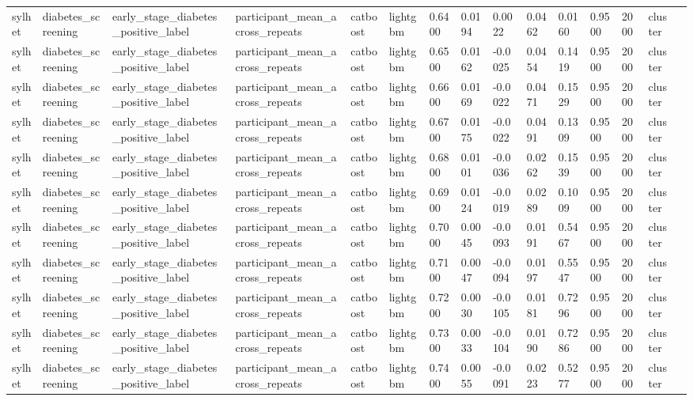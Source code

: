 \begin{tabular}{lllllllllllllll}
sylhet & diabetes\_screening & early\_stage\_diabetes\_positive\_label & participant\_mean\_across\_repeats & catboost & lightgbm & 0.6400 & 0.0194 & 0.0022 & 0.0462 & 0.0160 & 0.9500 & 2000 & cluster &  \\
sylhet & diabetes\_screening & early\_stage\_diabetes\_positive\_label & participant\_mean\_across\_repeats & catboost & lightgbm & 0.6500 & 0.0162 & -0.0025 & 0.0454 & 0.1419 & 0.9500 & 2000 & cluster &  \\
sylhet & diabetes\_screening & early\_stage\_diabetes\_positive\_label & participant\_mean\_across\_repeats & catboost & lightgbm & 0.6600 & 0.0169 & -0.0022 & 0.0471 & 0.1529 & 0.9500 & 2000 & cluster &  \\
sylhet & diabetes\_screening & early\_stage\_diabetes\_positive\_label & participant\_mean\_across\_repeats & catboost & lightgbm & 0.6700 & 0.0175 & -0.0022 & 0.0491 & 0.1309 & 0.9500 & 2000 & cluster &  \\
sylhet & diabetes\_screening & early\_stage\_diabetes\_positive\_label & participant\_mean\_across\_repeats & catboost & lightgbm & 0.6800 & 0.0101 & -0.0036 & 0.0262 & 0.1539 & 0.9500 & 2000 & cluster &  \\
sylhet & diabetes\_screening & early\_stage\_diabetes\_positive\_label & participant\_mean\_across\_repeats & catboost & lightgbm & 0.6900 & 0.0124 & -0.0019 & 0.0289 & 0.1009 & 0.9500 & 2000 & cluster &  \\
sylhet & diabetes\_screening & early\_stage\_diabetes\_positive\_label & participant\_mean\_across\_repeats & catboost & lightgbm & 0.7000 & 0.0045 & -0.0093 & 0.0191 & 0.5467 & 0.9500 & 2000 & cluster &  \\
sylhet & diabetes\_screening & early\_stage\_diabetes\_positive\_label & participant\_mean\_across\_repeats & catboost & lightgbm & 0.7100 & 0.0047 & -0.0094 & 0.0197 & 0.5547 & 0.9500 & 2000 & cluster &  \\
sylhet & diabetes\_screening & early\_stage\_diabetes\_positive\_label & participant\_mean\_across\_repeats & catboost & lightgbm & 0.7200 & 0.0030 & -0.0105 & 0.0181 & 0.7296 & 0.9500 & 2000 & cluster &  \\
sylhet & diabetes\_screening & early\_stage\_diabetes\_positive\_label & participant\_mean\_across\_repeats & catboost & lightgbm & 0.7300 & 0.0033 & -0.0104 & 0.0190 & 0.7286 & 0.9500 & 2000 & cluster &  \\
sylhet & diabetes\_screening & early\_stage\_diabetes\_positive\_label & participant\_mean\_across\_repeats & catboost & lightgbm & 0.7400 & 0.0055 & -0.0091 & 0.0223 & 0.5277 & 0.9500 & 2000 & cluster &  \\

\end{tabular}
